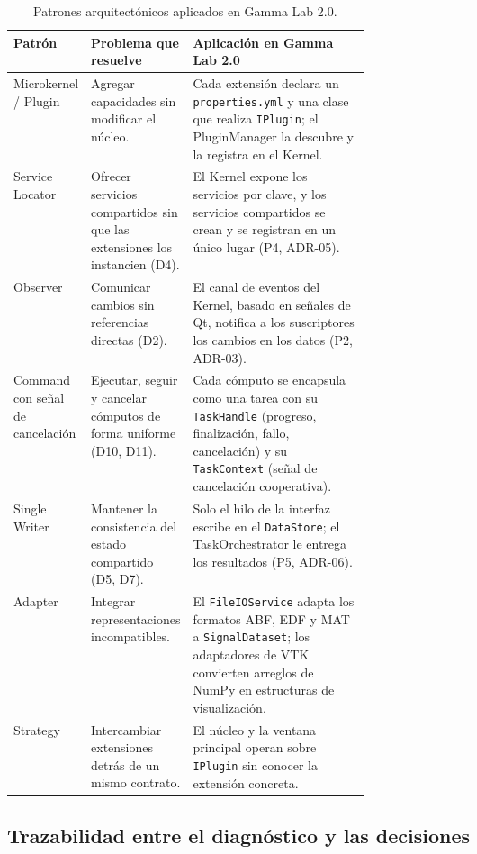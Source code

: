 \documentclass[11pt,a4paper]{article}
\DeclareRobustCommand{\_}{\textunderscore\allowbreak}
\begin{document}
\begin{table}[H]
\centering
\small
\renewcommand{\arraystretch}{1.15}
\begin{tabularx}{\linewidth}{|>{\raggedright\arraybackslash}p{0.19\linewidth}|>{\raggedright\arraybackslash}p{0.27\linewidth}|X|}
\hline
\textbf{Patrón} & \textbf{Problema que resuelve} & \textbf{Aplicación en Gamma Lab 2.0} \\
\hline
Microkernel / Plugin & Agregar capacidades sin modificar el núcleo. & Cada extensión declara un \texttt{properties.yml} y una clase que realiza \texttt{IPlugin}; el PluginManager la descubre y la registra en el Kernel. \\
\hline
Service Locator & Ofrecer servicios compartidos sin que las extensiones los instancien (D4). & El Kernel expone los servicios por clave, y los servicios compartidos se crean y se registran en un único lugar (P4, ADR-05). \\
\hline
Observer & Comunicar cambios sin referencias directas (D2). & El canal de eventos del Kernel, basado en señales de Qt, notifica a los suscriptores los cambios en los datos (P2, ADR-03). \\
\hline
Command con señal de cancelación & Ejecutar, seguir y cancelar cómputos de forma uniforme (D10, D11). & Cada cómputo se encapsula como una tarea con su \texttt{TaskHandle} (progreso, finalización, fallo, cancelación) y su \texttt{TaskContext} (señal de cancelación cooperativa). \\
\hline
Single Writer & Mantener la consistencia del estado compartido (D5, D7). & Solo el hilo de la interfaz escribe en el \texttt{DataStore}; el TaskOrchestrator le entrega los resultados (P5, ADR-06). \\
\hline
Adapter & Integrar representaciones incompatibles. & El \texttt{FileIOService} adapta los formatos ABF, EDF y MAT a \texttt{SignalDataset}; los adaptadores de VTK convierten arreglos de NumPy en estructuras de visualización. \\
\hline
Strategy & Intercambiar extensiones detrás de un mismo contrato. & El núcleo y la ventana principal operan sobre \texttt{IPlugin} sin conocer la extensión concreta. \\
\hline
\end{tabularx}
\caption{Patrones arquitectónicos aplicados en Gamma Lab 2.0.}
\label{tab:patrones_arquitectonicos}
\end{table}

\subsection{Trazabilidad entre el diagnóstico y las decisiones}
\end{document}
